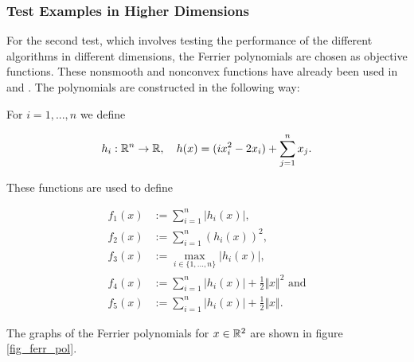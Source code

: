 
\subsubsection{Test Examples in Higher Dimensions}
\label{sec_num_test_ferr}

For the second test, which involves testing the performance of the different algorithms in different dimensions, the Ferrier polynomials are chosen as objective functions. These nonsmooth and nonconvex functions have already been used in \cite{Hare2010} and \cite{Hare2016}. The polynomials are constructed in the following way:

For \(i = 1,...,n\) we define 

\begin{align*}
	h_i: \mathbb{R}^n \to \mathbb{R}, \quad h(x) = (ix_i^2-2x_i)+\sum_{j=1}^n x_j.
\end{align*}

These functions are used to define

\begin{align*}
	f_1(x) &:= \sum_{i=1}^n |h_i(x)|, \\
	f_2(x) &:= \sum_{i=1}^n (h_i(x))^2, \\
	f_3(x) &:= \max_{i \in \{1,...,n\}}|h_i(x)|, \\
	f_4(x) &:= \sum_{i=1}^n \vert h_i(x)\vert+\frac{1}{2}\Vert x\Vert^2 \text{ and} \\
	f_5(x) &:= \sum_{i=1}^n \vert h_i(x)\vert+\frac{1}{2}\Vert x\Vert.
\end{align*}


The graphs of the Ferrier polynomials for \(x \in \mathbb{R}^2\) are shown in figure \ref{fig_ferr_pol}.

